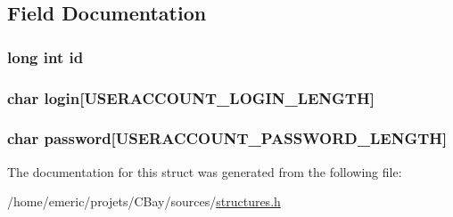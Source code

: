 \subsection{Field Documentation}
\hypertarget{struct_confidential_i_d_s_a53f4656a3ccbae3d40e94f582eef745f}{
\subsubsection[{id}]{\setlength{\rightskip}{0pt plus 5cm}long int id}}\label{struct_confidential_i_d_s_a53f4656a3ccbae3d40e94f582eef745f}
\hypertarget{struct_confidential_i_d_s_a4bf7e90f51b7f7d3617117ae6f12c052}{
\subsubsection[{login}]{\setlength{\rightskip}{0pt plus 5cm}char login\mbox{[}{\bf U\-S\-E\-R\-A\-C\-C\-O\-U\-N\-T\-\_\-\-L\-O\-G\-I\-N\-\_\-\-L\-E\-N\-G\-T\-H}\mbox{]}}}\label{struct_confidential_i_d_s_a4bf7e90f51b7f7d3617117ae6f12c052}
\hypertarget{struct_confidential_i_d_s_a79861f2b044c93f50ef5ffe118c1e28d}{
\subsubsection[{password}]{\setlength{\rightskip}{0pt plus 5cm}char password\mbox{[}{\bf U\-S\-E\-R\-A\-C\-C\-O\-U\-N\-T\-\_\-\-P\-A\-S\-S\-W\-O\-R\-D\-\_\-\-L\-E\-N\-G\-T\-H}\mbox{]}}}\label{struct_confidential_i_d_s_a79861f2b044c93f50ef5ffe118c1e28d}


The documentation for this struct was generated from the following file\-:\begin{DoxyCompactItemize}
\item 
/home/emeric/projets/\-C\-Bay/sources/\hyperlink{structures_8h}{structures.\-h}\end{DoxyCompactItemize}

